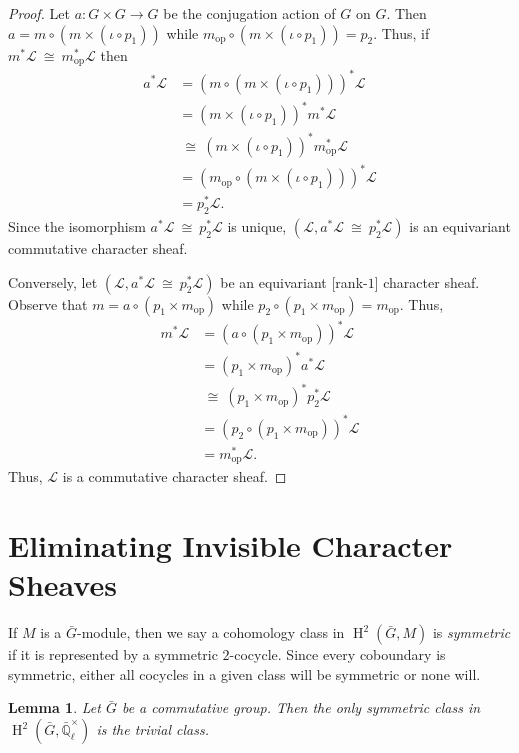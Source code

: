 \documentclass[10pt]{amsart}
\theoremstyle{plain}
\newtheorem{lemma}[theorem]{Lemma}
\theoremstyle{definition}
\newcommand{\EE}{\mathbb{\bar Q}_\ell}
\newcommand{\EEx}{\EE^\times}
\DeclareMathOperator{\Hh}{H}
\newcommand{\op}{_{\operatorname{op}}}
\newcommand{\iso}{{\ \cong\ }}
\newcommand{\cs}[1]{{\mathcal{#1}}}
\newcommand{\bG}{\bar{G}}
\begin{document}
\begin{proof}
Let $a : G \times G \to G$ be the conjugation action of $G$ on $G$. Then $a = m \circ (m \times (\iota \circ p_1))$ while $m\op \circ (m \times (\iota \circ p_1)) = p_2$. Thus, if $m^*\cs{L} \iso m\op^*\cs{L}$ then
\begin{align*}
a^* \cs{L} 
&= (m \circ (m \times (\iota \circ p_1)))^* \cs{L}\\
&= (m \times (\iota \circ p_1))^* m^* \cs{L}\\
&\iso (m \times (\iota \circ p_1))^* m\op^* \cs{L}\\
&= (m\op \circ (m \times (\iota \circ p_1)))^* \cs{L}\\
&= p_2^*\cs{L}.
\end{align*}
Since the isomorphism $a^*\cs{L} \iso p_2^*\cs{L}$ is unique, $(\cs{L}, a^*\cs{L} \iso p_2^*\cs{L})$ is an equivariant commutative character sheaf.

Conversely, let $(\cs{L}, a^*\cs{L} \iso p_2^*\cs{L})$ be an equivariant [rank-$1$] character sheaf.
Observe that $m = a \circ (p_1\times m\op)$ while $p_2 \circ (p_1\times m\op) = m\op$. Thus, 
\begin{align*}
m^* \cs{L} 
&= (a \circ (p_1 \times m\op))^* \cs{L}\\
&= (p_1 \times m\op)^* a^* \cs{L}\\
&\iso (p_1 \times m\op)^* p_2^* \cs{L}\\
&= (p_2\circ (p_1 \times m\op))^* \cs{L}\\
&= m\op^* \cs{L}.
\end{align*}
Thus, $\cs{L}$ is a commutative character sheaf.
\end{proof}


\section{Eliminating Invisible Character Sheaves}\label{sec:defect}

If $M$ is a $\bG$-module, then we say a cohomology class in $\Hh^2(\bG, M)$ is \emph{symmetric} if it is represented
by a symmetric $2$-cocycle.  Since every coboundary is symmetric, either all cocycles in a given class will be symmetric
or none will.

\begin{lemma} \label{lem:symtriv}
Let $\bG$ be a commutative group.  Then the only symmetric class in $\Hh^2(\bG, \EEx)$ is the trivial class.
\end{lemma}
\end{document}
